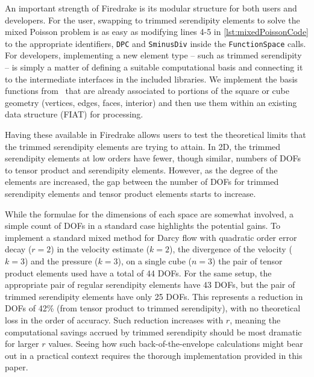 \documentclass[format=acmsmall,screen,timestamp=false,a4paper]{acmart}
\begin{document}
  
  
	An important strength of Firedrake is its modular structure for both users and developers.
   For the user, swapping to trimmed serendipity elements to solve the mixed Poisson problem is as easy as modifying lines 4-5 in \cref{lst:mixedPoissonCode} to the appropriate identifiers, \texttt{DPC} and \texttt{SminusDiv} inside the \texttt{FunctionSpace} calls.  
   For developers, implementing a new element type -- such as trimmed serendipity -- is simply a matter of defining a suitable computational basis and connecting it to the intermediate interfaces in the included libraries.  We implement the basis functions from~\cite{gillette2019computational} that are already associated to portions of the square or cube geometry (vertices, edges, faces, interior) and then use them within an existing data structure (FIAT) for processing.
   
   Having these available in Firedrake allows users to test the theoretical limits that the trimmed serendipity elements are trying to attain.  In 2D, the trimmed serendipity elements at low orders have fewer, though similar, numbers of DOFs to tensor product and serendipity elements.  However, as the degree of the elements are increased, the gap between the number of DOFs for trimmed serendipity elements and tensor product elements starts to increase.  
   
   While the formulae for the dimensions of each space are somewhat involved, a simple count of DOFs in a standard case highlights the potential gains.
	To implement a standard mixed method for Darcy flow with quadratic order error decay ($r=2$) in the velocity estimate ($k=2$), the divergence of the velocity ($k=3$) and the pressure ($k=3$), on a single cube ($n=3$) the pair of tensor product elements used have a total of 44 DOFs.
	For the same setup, the appropriate pair of regular serendipity elements have 43 DOFs, but the pair of trimmed serendipity elements have only 25 DOFs. 
	This represents a reduction in DOFs of 42\% (from tensor product to trimmed serendipity), with no theoretical loss in the order of accuracy.
	Such reduction increases with $r$, meaning the computational savings accrued by trimmed serendipity should be most dramatic for larger $r$ values.
	Seeing how such back-of-the-envelope calculations might bear out in a practical context requires the thorough implementation provided in this paper.
   
\end{document}
